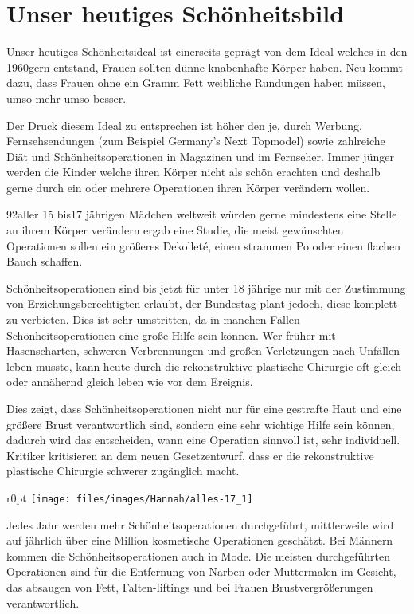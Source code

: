 \section{Unser heutiges Schönheitsbild}
Unser heutiges Schönheitsideal ist einerseits geprägt von dem Ideal welches in den 1960gern entstand,
Frauen sollten dünne knabenhafte Körper haben. Neu kommt dazu, dass Frauen ohne ein Gramm Fett
weibliche Rundungen haben müssen, umso mehr umso besser.

Der Druck diesem Ideal zu entsprechen ist höher den je, durch Werbung, Fernsehsendungen (zum Beispiel
Germany’s Next Topmodel) sowie zahlreiche Diät und Schönheitsoperationen in Magazinen und im
Fernseher. Immer jünger werden die Kinder welche ihren Körper nicht als schön erachten und deshalb
gerne durch ein oder mehrere Operationen ihren Körper verändern wollen.

92\Prozent aller 15 bis17 jährigen Mädchen weltweit würden gerne mindestens eine Stelle an ihrem
Körper verändern ergab eine Studie, die meist gewünschten Operationen sollen ein größeres Dekolleté,
einen strammen Po oder einen flachen Bauch schaffen.

Schönheitsoperationen sind bis jetzt für unter 18 jährige nur mit der Zustimmung von
Erziehungsberechtigten erlaubt, der Bundestag plant jedoch, diese komplett zu verbieten. Dies ist
sehr umstritten, da in manchen Fällen Schönheitsoperationen eine große Hilfe sein können. Wer früher
mit Hasenscharten, schweren Verbrennungen und großen Verletzungen nach Unfällen leben musste, kann
heute durch die rekonstruktive plastische Chirurgie oft gleich oder annähernd gleich leben wie vor
dem Ereignis.

Dies zeigt, dass Schönheitsoperationen nicht nur für eine gestrafte Haut und eine größere Brust
verantwortlich sind, sondern eine sehr wichtige Hilfe sein können, dadurch wird das entscheiden, wann
eine Operation sinnvoll ist, sehr individuell. Kritiker kritisieren an dem neuen Gesetzentwurf, dass
er die rekonstruktive plastische Chirurgie schwerer zugänglich macht.

\begin{wrapfigure}{r}{0pt}
	\texttt{[image: files/images/Hannah/alles-17\_1]}%
	\label{fig:Botox}
\end{wrapfigure}
Jedes Jahr werden mehr Schönheitsoperationen durchgeführt, mittlerweile wird auf jährlich über eine
Million kosmetische Operationen geschätzt. Bei Männern kommen die Schönheitsoperationen auch in Mode.
Die meisten durchgeführten Operationen sind für die Entfernung von Narben oder Muttermalen im
Gesicht, das absaugen von Fett, Falten-liftings und bei Frauen Brustvergrößerungen verantwortlich.

